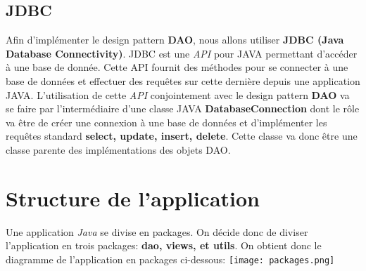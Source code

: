 \documentclass[a4paper,12pt, french]{report}
\begin{document}
  \subsection{JDBC}
    Afin d'implémenter le design pattern \textbf{DAO}, nous allons utiliser \textbf{JDBC (Java Database Connectivity)}. JDBC est une \emph{API} pour JAVA permettant d'accéder à une base de donnée. Cette API fournit des méthodes pour se connecter à une base de données et effectuer des requêtes sur cette dernière depuis une application JAVA. L'utilisation de cette \emph{API} conjointement avec le design pattern \textbf{DAO} va se faire par l'intermédiaire d'une classe JAVA \textbf{DatabaseConnection} dont le rôle va être de créer une connexion à une base de données et d'implémenter les requêtes standard \textbf{select, update, insert, delete}. Cette classe va donc être une classe parente des implémentations des objets DAO.
	\section{Structure de l'application}
		Une application \emph{Java} se divise en packages. On décide donc de diviser l'application en trois packages: \textbf{dao, views, et utils}.
		On obtient donc le diagramme de l'application en packages ci-dessous: \newline
		\texttt{[image: packages.png]}
\end{document}
